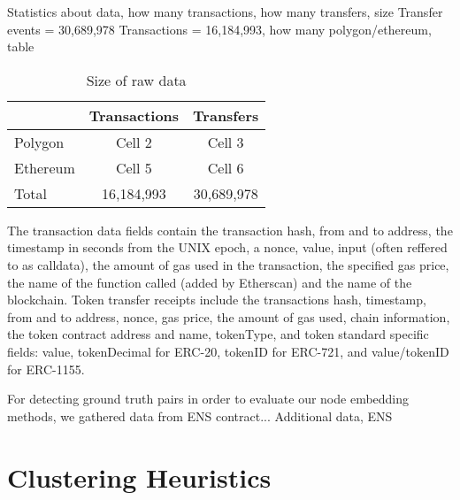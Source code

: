 \documentclass[12pt,a4paper,titlepage,oneside,english]{article}
\begin{document}
Statistics about data, how many transactions, how many transfers, size
Transfer events = 30,689,978
Transactions = 16,184,993, how many polygon/ethereum, table

\begin{table}[h]
\centering
\begin{tabular}{lcc}
\hline \hline
  & Transactions & Transfers \\
 \hline
 Polygon & Cell 2 & Cell 3 \\
 Ethereum & Cell 5 & Cell 6 \\
 \hline
 Total & 16,184,993 & 30,689,978 \\
 \hline \hline
\end{tabular}
\caption{Size of raw data}
\label{tab:data_size}
\end{table}


The transaction data fields contain the transaction hash, from and to address, the timestamp in seconds from the UNIX epoch, a nonce, value, input (often reffered to as calldata), the amount of gas used in the transaction, the specified gas price, the name of the function called (added by Etherscan) and the name of the blockchain.
Token transfer receipts include the transactions hash, timestamp, from and to address, nonce, gas price, the amount of gas used, chain information, the token contract address and name, tokenType, and token standard specific fields: value, tokenDecimal for ERC-20, tokenID for ERC-721, and value/tokenID for ERC-1155.



For detecting ground truth pairs in order to evaluate our node embedding methods, we gathered data from ENS contract...
Additional data, ENS \\



\section{Clustering Heuristics}
\end{document}
